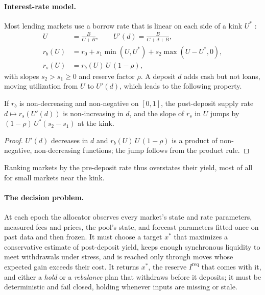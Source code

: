 \documentclass[sigconf]{acmart}
\begin{document}
\paragraph{Interest-rate model.}
Most lending markets use a borrow rate that is linear on each side of a kink $U^{*}$ \citep{aaveirm,compoundrates,moonwellcurves}:
\begin{align}
  U &= \frac{B}{C+B}, \qquad U'(d) = \frac{B}{C+d+B}, \label{eq:util}\\
  r_b(U) &= r_0 + s_1 \min(U, U^{*}) + s_2 \max(U - U^{*}, 0), \label{eq:borrow}\\
  r_s(U) &= r_b(U)\, U\, (1 - \rho), \label{eq:supply}
\end{align}
with slopes $s_2 > s_1 \ge 0$ and reserve factor $\rho$. A deposit $d$ adds cash but not loans, moving utilization from $U$ to $U'(d)$, which leads to the following property.

\begin{proposition}
\label{prop:monotone}
If $r_b$ is non-decreasing and non-negative on $[0,1]$, the post-deposit supply rate $d \mapsto r_s(U'(d))$ is non-increasing in $d$, and the slope of $r_s$ in $U$ jumps by ${(1-\rho)\,U^{*}(s_2 - s_1)}$ at the kink.
\end{proposition}
\begin{proof}
$U'(d)$ decreases in $d$ and $r_b(U)\,U\,(1-\rho)$ is a product of non-negative, non-decreasing functions; the jump follows from the product rule.
\end{proof}

Ranking markets by the pre-deposit rate thus overstates their yield, most of all for small markets near the kink.

\paragraph{The decision problem.}
At each epoch the allocator observes every market's state and rate parameters, measured fees and prices, the pool's state, and forecast parameters fitted once on past data and then frozen. It must choose a target $x^{*}$ that maximizes a conservative estimate of post-deposit yield, keeps enough synchronous liquidity to meet withdrawals under stress, and is reached only through moves whose expected gain exceeds their cost. It returns $x^{*}$, the reserve $I^{\mathrm{req}}$ that comes with it, and either a \emph{hold} or a \emph{rebalance} plan that withdraws before it deposits; it must be deterministic and fail closed, holding whenever inputs are missing or stale.
\end{document}
